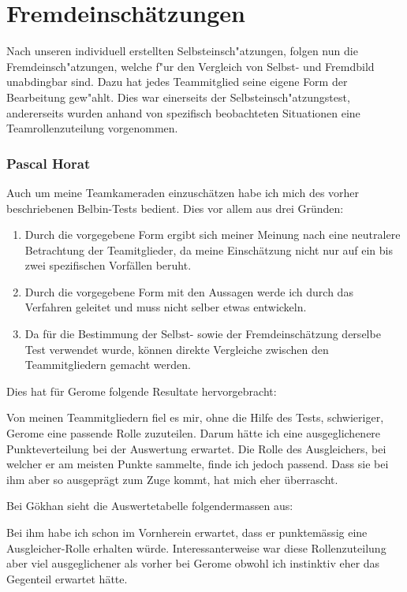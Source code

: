 \chapter{Fremdeinschätzungen}\label{Fremdeinschaetzung}
Nach unseren individuell erstellten Selbsteinsch"atzungen, folgen nun die Fremdeinsch"atzungen, welche f"ur
den Vergleich von Selbst- und Fremdbild unabdingbar sind.
Dazu hat jedes Teammitglied seine eigene Form der Bearbeitung gew"ahlt. Dies war einerseits der Selbsteinsch"atzungstest, andererseits wurden anhand von spezifisch beobachteten Situationen eine Teamrollenzuteilung
vorgenommen.
\subsection*{Pascal Horat}

Auch um meine Teamkameraden einzuschätzen habe ich mich des vorher beschriebenen Belbin-Tests bedient. Dies vor allem aus drei Gründen:
\begin{enumerate}
\item Durch die vorgegebene Form ergibt sich meiner Meinung nach eine neutralere Betrachtung der Teamitglieder, da meine Einschätzung nicht nur auf ein bis zwei spezifischen Vorfällen beruht.
\item Durch die vorgegebene Form mit den Aussagen werde ich durch das Verfahren geleitet und muss nicht selber etwas entwickeln.
\item Da für die Bestimmung der Selbst- sowie der Fremdeinschätzung derselbe Test verwendet wurde, können direkte Vergleiche zwischen den Teammitgliedern gemacht werden.
\end{enumerate}

Dies hat für Gerome folgende Resultate hervorgebracht:



Von meinen Teammitgliedern fiel es mir, ohne die Hilfe des Tests, schwieriger, Gerome eine passende Rolle zuzuteilen. Darum hätte ich eine ausgeglichenere Punkteverteilung bei der Auswertung erwartet. Die Rolle des Ausgleichers, bei welcher er am meisten Punkte sammelte, finde ich jedoch passend. Dass sie bei ihm aber so ausgeprägt zum Zuge kommt, hat mich eher überrascht.

Bei Gökhan sieht die Auswertetabelle folgendermassen aus:



Bei ihm habe ich schon im Vornherein erwartet, dass er punktemässig eine Ausgleicher-Rolle erhalten würde. Interessanterweise war diese Rollenzuteilung aber viel ausgeglichener als vorher bei Gerome obwohl ich instinktiv eher das Gegenteil erwartet hätte. 

